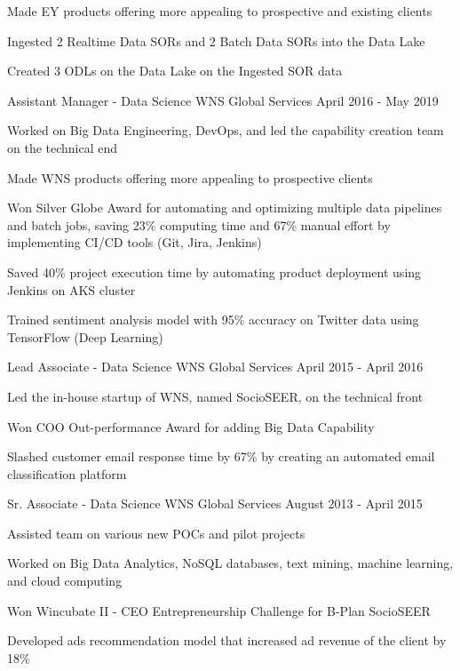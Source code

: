 \documentclass[]{awesome-cv}
\begin{document}
\begin{cventries}
{\begin{cvitems}
				\item Made EY products offering more appealing to prospective and existing clients
				\item Ingested 2 Realtime Data SORs and 2 Batch Data SORs into the Data Lake
				\item Created 3 ODLs on the Data Lake on the Ingested SOR data
		 \end{cvitems} }
	\cventry
	{ Assistant Manager {-} Data Science  }
	{ WNS Global Services  }
	{}
	{ April 2016 -   May 2019 }
	{ \begin{cvitems} 		\item Worked on Big Data Engineering, DevOps, and led the capability creation team on the technical end
				\item Made WNS products offering more appealing to prospective clients
				\item Won Silver Globe Award for automating and optimizing multiple data pipelines and batch jobs, saving 23\% computing time and 67\% manual effort by implementing CI/CD tools (Git, Jira, Jenkins)
				\item Saved 40\% project execution time by automating product deployment using Jenkins on AKS cluster
				\item Trained sentiment analysis model with 95\% accuracy on Twitter data using TensorFlow (Deep Learning)
		 \end{cvitems} }
	\cventry
	{ Lead Associate {-} Data Science  }
	{ WNS Global Services  }
	{}
	{ April 2015 -   April 2016 }
	{ \begin{cvitems} 		\item Led the in{-}house startup of WNS, named SocioSEER, on the technical front
				\item Won COO Out{-}performance Award for adding Big Data Capability
				\item Slashed customer email response time by 67\% by creating an automated email classification platform
		 \end{cvitems} }
	\cventry
	{ Sr. Associate {-} Data Science  }
	{ WNS Global Services  }
	{}
	{ August 2013 -   April 2015 }
	{ \begin{cvitems} 		\item Assisted team on various new POCs and pilot projects
				\item Worked on Big Data Analytics, NoSQL databases, text mining, machine learning, and cloud computing
				\item Won Wincubate II {-} CEO Entrepreneurship Challenge for B{-}Plan SocioSEER
				\item Developed ads recommendation model that increased ad revenue of the client by 18\%

\end{cvitems}}
\end{cventries}
\end{document}
